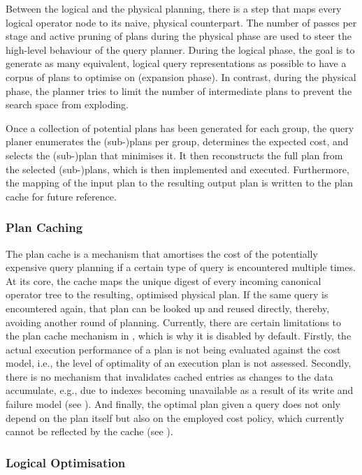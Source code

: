 Between the logical and the physical planning, there is a step that maps every logical operator node to its naive, physical counterpart. The number of passes per stage and active pruning of plans during the physical phase are used to steer the high-level behaviour of the query planner. During the logical phase, the goal is to generate as many equivalent, logical query representations as possible to have a corpus of plans to optimise on (expansion phase). In contrast, during the physical phase, the planner tries to limit the number of intermediate plans to prevent the search space from exploding.

Once a collection of potential plans has been generated for each group, the query planer enumerates the (sub-)plans per group, determines the expected cost, and selects the (sub-)plan that minimises it. It then reconstructs the full plan from the selected (sub-)plans, which is then implemented and executed. Furthermore, the mapping of the input plan to the resulting output plan is written to the plan cache for future reference.

\subsubsection{Plan Caching}

The plan cache is a mechanism that amortises the cost of the potentially expensive query planning if a certain type of query is encountered multiple times. At its core, the cache maps the unique digest of every incoming canonical operator tree to the resulting, optimised physical plan. If the same query is encountered again, that plan can be looked up and reused directly, thereby, avoiding another round of planning. Currently, there are certain limitations to the plan cache mechanism in \cottontail{}, which is why it is disabled by default. Firstly, the actual execution performance of a plan is not being evaluated against the cost model, i.e., the level of optimality of an execution plan is not assessed. Secondly, there is no mechanism that invalidates cached entries as changes to the data accumulate, e.g., due to indexes becoming unavailable as a result of its write and failure model (see ). And finally, the optimal plan given a query does not only depend on the plan itself but also on the employed cost policy, which currently cannot be reflected by the cache (see ).

\subsubsection{Logical Optimisation}

